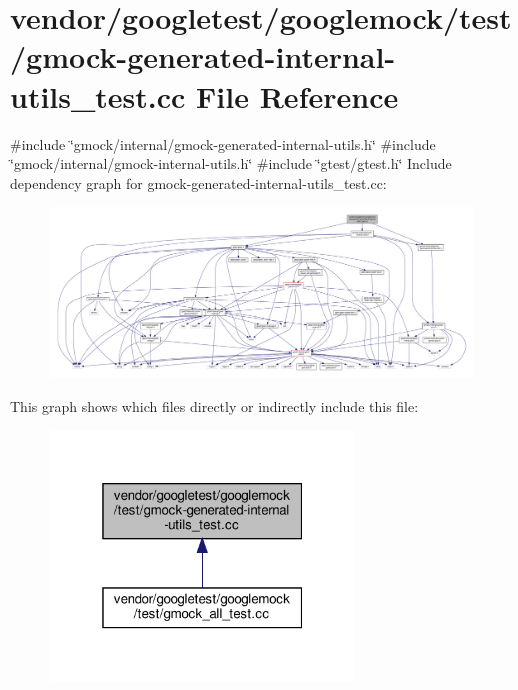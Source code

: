 \hypertarget{gmock-generated-internal-utils__test_8cc}{}\section{vendor/googletest/googlemock/test/gmock-\/generated-\/internal-\/utils\+\_\+test.cc File Reference}
\label{gmock-generated-internal-utils__test_8cc}
{\ttfamily \#include \char`\"{}gmock/internal/gmock-\/generated-\/internal-\/utils.\+h\char`\"{}}\newline
{\ttfamily \#include \char`\"{}gmock/internal/gmock-\/internal-\/utils.\+h\char`\"{}}\newline
{\ttfamily \#include \char`\"{}gtest/gtest.\+h\char`\"{}}\newline
Include dependency graph for gmock-\/generated-\/internal-\/utils\+\_\+test.cc\+:
\nopagebreak
\begin{figure}[H]
\begin{center}
\leavevmode
\includegraphics[width=350pt]{gmock-generated-internal-utils__test_8cc__incl}
\end{center}
\end{figure}
This graph shows which files directly or indirectly include this file\+:
\nopagebreak
\begin{figure}[H]
\begin{center}
\leavevmode
\includegraphics[width=229pt]{gmock-generated-internal-utils__test_8cc__dep__incl}
\end{center}
\end{figure}
